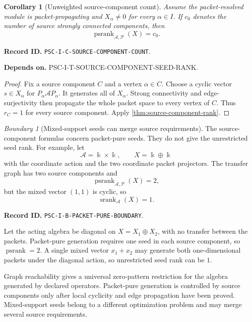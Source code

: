 \documentclass[11pt]{article}
\newtheorem{corollary}[corollary]{Corollary}
\theoremstyle{definition}
\theoremstyle{remark}
\newtheorem{boundary}[boundary]{Boundary}
\newcommand{\bbk}{\Bbbk}
\newcommand{\A}{\mathcal A}
\newcommand{\Pcal}{\mathcal P}
\newcommand{\srank}{\operatorname{srank}}
\newcommand{\psrank}{\operatorname{psrank}}
\newcommand{\RecordID}[1]{\par\smallskip\noindent\begingroup\footnotesize\color{PSCGray}\raggedright\textbf{Record ID.} \nolinkurl{#1}.\par\endgroup}
\newcommand{\Depends}[1]{\par\noindent\begingroup\footnotesize\color{PSCGray}\raggedright\textbf{Depends on.} #1\par\endgroup}
\begin{document}
\begin{corollary}[Unweighted source-component count]
\label{cor:source-component-count}
Assume the packet-resolved module is packet-propagating and $X_\alpha\neq0$ for every $\alpha\in I$.  If $c_0$ denotes the number of source strongly connected components, then
\[
\boxed{
\psrank_{\A,\Pcal}(X)=c_0.
}
\]
\end{corollary}
\RecordID{PSC-I-C-SOURCE-COMPONENT-COUNT}
\Depends{PSC-I-T-SOURCE-COMPONENT-SEED-RANK.}

\begin{proof}
Fix a source component $C$ and a vertex $\alpha\in C$.  Choose a cyclic vector $s\in X_\alpha$ for $P_\alpha\A P_\alpha$.  It generates all of $X_\alpha$.  Strong connectivity and edge-surjectivity then propagate the whole packet space to every vertex of $C$.  Thus $r_C=1$ for every source component.  Apply \cref{thm:source-component-rank}.
\end{proof}

\begin{boundary}[Mixed-support seeds can merge source requirements]
\label{bnd:packet-pure-boundary}
The source-component formulas concern packet-pure seeds.  They do not give the unrestricted seed rank.  For example, let
\[
\A=\bbk\times\bbk,
\qquad
X=\bbk\oplus\bbk
\]
with the coordinate action and the two coordinate packet projectors.  The transfer graph has two source components and
\[
\psrank_{\A,\Pcal}(X)=2,
\]
but the mixed vector $(1,1)$ is cyclic, so
\[
\srank_\A(X)=1.
\]
\end{boundary}
\RecordID{PSC-I-B-PACKET-PURE-BOUNDARY}

\begin{microexample}[title={Why mixed seeds change the answer}]
Let the acting algebra be diagonal on \(X=X_1\oplus X_2\), with no transfer between the packets.  Packet-pure generation requires one seed in each source component, so \(\psrank=2\).  A single mixed vector \(x_1+x_2\) may generate both one-dimensional packets under the diagonal action, so unrestricted seed rank can be \(1\).
\end{microexample}

\begin{sectionrecap}
Graph reachability gives a universal zero-pattern restriction for the algebra generated by declared operators.  Packet-pure generation is controlled by source components only after local cyclicity and edge propagation have been proved.  Mixed-support seeds belong to a different optimization problem and may merge several source requirements.
\end{sectionrecap}
\end{document}
